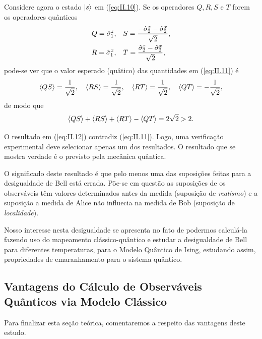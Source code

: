 Considere agora o estado $\ket{s}$ em (\ref{eq:II.10}). Se os operadores $Q, R, S$ e $T$ forem os operadores quânticos
\begin{align*}
	Q = \hat{\sigma}^z_1, \quad &S = \frac{-\hat{\sigma}^z_2 - \hat{\sigma}^x_2}{\sqrt{2}}, \\
	R = \hat{\sigma}^x_1, \quad &T = \frac{\hat{\sigma}^z_2 - \hat{\sigma}^x_2}{\sqrt{2}},
\end{align*}
pode-se ver que o valor esperado (quâtico) das quantidades em (\ref{eq:II.11}) é
\begin{equation*}
	\ev{QS} = \frac{1}{\sqrt{2}}, \quad \ev{RS} = \frac{1}{\sqrt{2}}, \quad \ev{RT} = \frac{1}{\sqrt{2}}, \quad \ev{QT} = - \frac{1}{\sqrt{2}},
\end{equation*}
de modo que
\begin{equation}
	\ev{QS} + \ev{RS} + \ev{RT} - \ev{QT} = 2 \sqrt{2} > 2. 
	\label{eq:II.12}
\end{equation}

O resultado em (\ref{eq:II.12}) contradiz (\ref{eq:II.11}). Logo, uma verificação experimental deve selecionar apenas um dos resultados. O resultado que se mostra verdade é o previsto pela mecânica quântica. 

O significado deste resultado é que pelo menos uma das suposições feitas para a desigualdade de Bell está errada. Põe-se em questão as suposições de os observáveis têm valores determinados antes da medida (suposição de \textit{realismo}) e a suposição a medida de Alice não influecia na medida de Bob (suposição de \textit{localidade}).

Nosso interesse nesta desigualdade se apresenta no fato de podermos calculá-la fazendo uso do mapeamento clássico-quântico  e estudar a desigualdade de Bell para diferentes temperaturas, para o Modelo Quântico de Ising, estudando assim, propriedades de emaranhamento para o sistema quântico.



\subsection{Vantagens do Cálculo de Observáveis Quânticos via Modelo Clássico}
\label{subsec:VantagensCalcObsrvViaModeloClassico}

Para finalizar esta seção teórica, comentaremos a respeito das vantagens deste estudo. 

